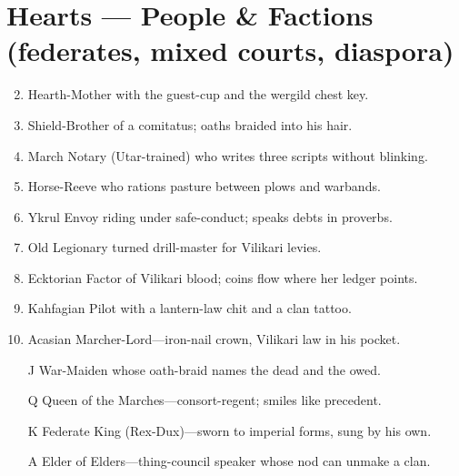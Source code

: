 \section*{Hearts --- People \& Factions (federates, mixed courts, diaspora)}
\begin{enumerate}
\setcounter{enumi}{1}
\item Hearth-Mother with the guest-cup and the wergild chest key.
\item Shield-Brother of a comitatus; oaths braided into his hair.
\item March Notary (Utar-trained) who writes three scripts without blinking.
\item Horse-Reeve who rations pasture between plows and warbands.
\item Ykrul Envoy riding under safe-conduct; speaks debts in proverbs.
\item Old Legionary turned drill-master for Vilikari levies.
\item Ecktorian Factor of Vilikari blood; coins flow where her ledger points.
\item Kahfagian Pilot with a lantern-law chit and a clan tattoo.
\item Acasian Marcher-Lord---iron-nail crown, Vilikari law in his pocket.
\item[J] War-Maiden whose oath-braid names the dead and the owed.
\item[Q] Queen of the Marches---consort-regent; smiles like precedent.
\item[K] Federate King (Rex-Dux)---sworn to imperial forms, sung by his own.
\item[A] Elder of Elders---thing-council speaker whose nod can unmake a clan.
\end{enumerate}

